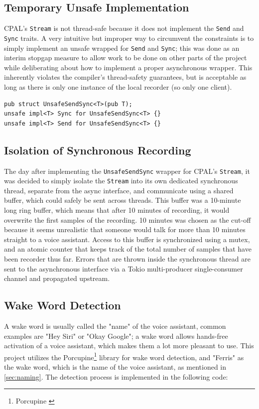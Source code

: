 \subsection{Temporary Unsafe Implementation}
CPAL's \texttt{Stream} is not thread-safe because it does not implement the \texttt{Send} and \texttt{Sync} traits.
A very intuitive but improper way to circumvent the constraints is to simply implement an unsafe wrapped for \texttt{Send} and \texttt{Sync};
this was done as an interim stopgap measure to allow work to be done on other parts of the project while deliberating about how to implement a proper asynchronous wrapper.
This inherently violates the compiler's thread-safety guarantees, but is acceptable as long as there is only one instance of the local recorder (so only one client).

\begin{verbatim}
pub struct UnsafeSendSync<T>(pub T);
unsafe impl<T> Sync for UnsafeSendSync<T> {}
unsafe impl<T> Send for UnsafeSendSync<T> {}
\end{verbatim}

\subsection{Isolation of Synchronous Recording}
The day after implementing the \texttt{UnsafeSendSync} wrapper for CPAL's \texttt{Stream}, it was decided to simply isolate the \texttt{Stream}
into its own dedicated synchronous thread, separate from the async interface, and communicate using a shared buffer, which could safely be sent across threads.
This buffer was a 10-minute long ring buffer, which means that after 10 minutes of recording, it would overwrite the first samples of the recording.
10 minutes was chosen as the cut-off because it seems unrealistic that someone would talk for more than 10 minutes straight to a voice assistant.
Access to this buffer is synchronized using a mutex, and an atomic counter that keeps track of the total number of samples that have been recorder thus far.
Errors that are thrown inside the synchronous thread are sent to the asynchronous interface via a Tokio multi-producer single-consumer channel and propagated upstream.

\subsection{Wake Word Detection}
A wake word is usually called the "name" of the voice assistant,
common examples are "Hey Siri" or "Okay Google";
a wake word allows hands-free activation of a voice assistant,
which makes them a lot more pleasant to use.
This project utilizes the Porcupine\footnote{Porcupine \cite{porcupine}} library for wake word detection,
and "Ferris" as the wake word, which is the name of the voice assistant, as mentioned in \ref{sec:naming}.
The detection process is implemented in the following code:

